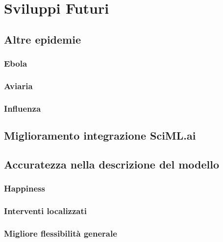 \section{Sviluppi Futuri}

\subsection{Altre epidemie}

\subsubsection{Ebola}

\subsubsection{Aviaria}

\subsubsection{Influenza}

\subsection{Miglioramento integrazione SciML.ai}

\subsection{Accuratezza nella descrizione del modello}

\subsubsection{Happiness}

\subsubsection{Interventi localizzati}

\subsubsection{Migliore flessibilità generale}
